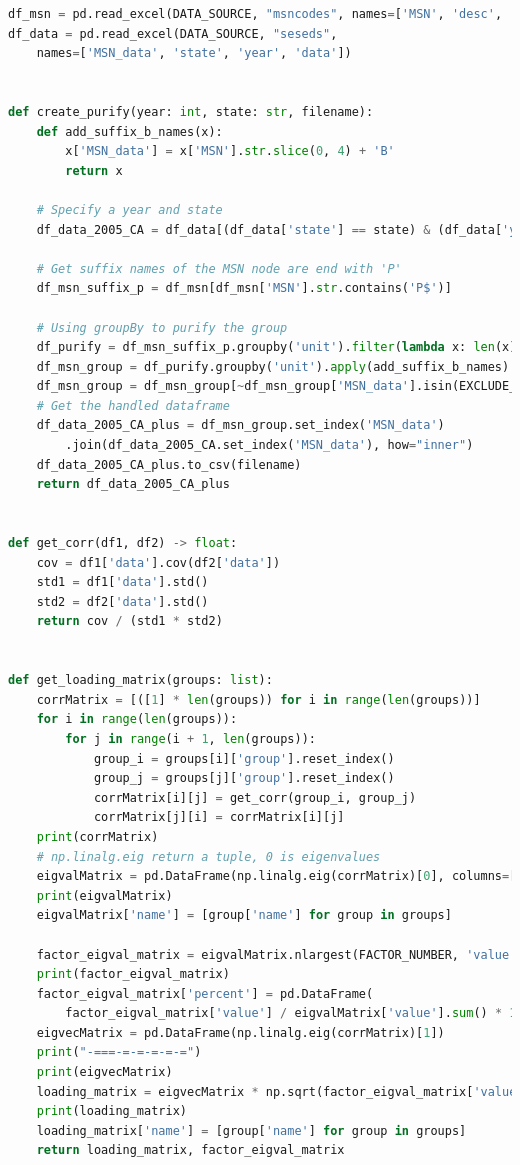 \documentclass[a4paper,11pt]{article}
\begin{document}
\begin{appendices}
\begin{lstlisting}[language=Python, caption=profile.py]
df_msn = pd.read_excel(DATA_SOURCE, "msncodes", names=['MSN', 'desc', 'unit'])
df_data = pd.read_excel(DATA_SOURCE, "seseds", 
    names=['MSN_data', 'state', 'year', 'data'])


def create_purify(year: int, state: str, filename):
    def add_suffix_b_names(x):
        x['MSN_data'] = x['MSN'].str.slice(0, 4) + 'B'
        return x

    # Specify a year and state
    df_data_2005_CA = df_data[(df_data['state'] == state) & (df_data['year'] == year)]

    # Get suffix names of the MSN node are end with 'P'
    df_msn_suffix_p = df_msn[df_msn['MSN'].str.contains('P$')]

    # Using groupBy to purify the group
    df_purify = df_msn_suffix_p.groupby('unit').filter(lambda x: len(x) > 1)
    df_msn_group = df_purify.groupby('unit').apply(add_suffix_b_names)
    df_msn_group = df_msn_group[~df_msn_group['MSN_data'].isin(EXCLUDE_MSN)]
    # Get the handled dataframe
    df_data_2005_CA_plus = df_msn_group.set_index('MSN_data')
        .join(df_data_2005_CA.set_index('MSN_data'), how="inner")
    df_data_2005_CA_plus.to_csv(filename)
    return df_data_2005_CA_plus


def get_corr(df1, df2) -> float:
    cov = df1['data'].cov(df2['data'])
    std1 = df1['data'].std()
    std2 = df2['data'].std()
    return cov / (std1 * std2)


def get_loading_matrix(groups: list):
    corrMatrix = [([1] * len(groups)) for i in range(len(groups))]
    for i in range(len(groups)):
        for j in range(i + 1, len(groups)):
            group_i = groups[i]['group'].reset_index()
            group_j = groups[j]['group'].reset_index()
            corrMatrix[i][j] = get_corr(group_i, group_j)
            corrMatrix[j][i] = corrMatrix[i][j]
    print(corrMatrix)
    # np.linalg.eig return a tuple, 0 is eigenvalues
    eigvalMatrix = pd.DataFrame(np.linalg.eig(corrMatrix)[0], columns=['value'])
    print(eigvalMatrix)
    eigvalMatrix['name'] = [group['name'] for group in groups]

    factor_eigval_matrix = eigvalMatrix.nlargest(FACTOR_NUMBER, 'value')
    print(factor_eigval_matrix)
    factor_eigval_matrix['percent'] = pd.DataFrame(
        factor_eigval_matrix['value'] / eigvalMatrix['value'].sum() * 100)
    eigvecMatrix = pd.DataFrame(np.linalg.eig(corrMatrix)[1])
    print("-===-=-=-=-=-=")
    print(eigvecMatrix)
    loading_matrix = eigvecMatrix * np.sqrt(factor_eigval_matrix['value'])
    print(loading_matrix)
    loading_matrix['name'] = [group['name'] for group in groups]
    return loading_matrix, factor_eigval_matrix



\end{lstlisting}
\end{appendices}
\end{document}
